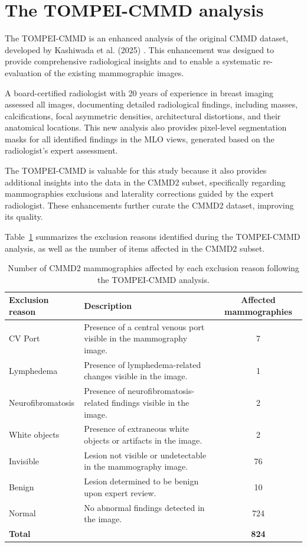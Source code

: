 \documentclass[a4paper,10pt]{book}
\begin{document}
\section{The TOMPEI-CMMD analysis}

The TOMPEI-CMMD is an enhanced analysis of the original CMMD dataset, developed by Kashiwada et al. (2025) \cite{kashiwada_tompei-cmmd_2025}. This enhancement was designed to provide comprehensive radiological insights and to enable a systematic re-evaluation of the existing mammographic images.

A board-certified radiologist with 20 years of experience in breast imaging assessed all images, documenting detailed radiological findings, including masses, calcifications, focal asymmetric densities, architectural distortions, and their anatomical locations. This new analysis also provides pixel-level segmentation masks for all identified findings in the MLO views, generated based on the radiologist’s expert assessment.

The TOMPEI-CMMD is valuable for this study because it also provides additional insights into the data in the CMMD2 subset, specifically regarding mammographies exclusions and laterality corrections guided by the expert radiologist. These enhancements further curate the CMMD2 dataset, improving its quality.

Table~\ref{tab:tompei_exclusions} summarizes the exclusion reasons identified during the TOMPEI-CMMD analysis, as well as the number of items affected in the CMMD2 subset.

\begin{table}[h!]
    \caption[TOMPEI-CMMD exclusion reasons]{Number of CMMD2 mammographies affected by each exclusion reason following the TOMPEI-CMMD analysis.}
    \centering
    \begin{tabular}{l p{6cm} c}
        \toprule
        \textbf{Exclusion reason} & \textbf{Description} & \textbf{Affected mammographies} \\
        \midrule
        CV Port & Presence of a central venous port visible in the mammography image. & 7 \\
        Lymphedema & Presence of lymphedema-related changes visible in the image. & 1 \\
        Neurofibromatosis & Presence of neurofibromatosis-related findings visible in the image. & 2 \\
        White objects & Presence of extraneous white objects or artifacts in the image. & 2 \\
        Invisible & Lesion not visible or undetectable in the mammography image. & 76 \\
        Benign & Lesion determined to be benign upon expert review. & 10 \\
        Normal & No abnormal findings detected in the image. & 724 \\
        \textbf{Total} &  & \textbf{824} \\
        \bottomrule
    \end{tabular}
    \label{tab:tompei_exclusions}
\end{table}
\end{document}
